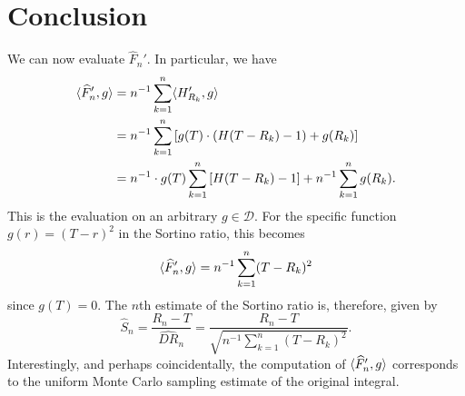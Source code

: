 \documentclass[12pt]{article}
\newcommand{\DD}{\mathcal{D}}
\newcommand{\inv}{{}^{-1}}
\renewcommand{\hat}{\widehat}
\DeclarePairedDelimiter{\ip}{\langle}{\rangle}
\begin{document}
\section{Conclusion}

We can now evaluate $\hat{F}_{n}'$. In particular, we have
\begin{align*}
  \ip{\hat{F}_n', g} &= n\inv \sum_{k=1}^{n} \ip{H_{R_k}', g} \\
  &= n\inv \sum_{k=1}^{n} \left[ 
    g(T) \cdot (H(T-R_k) - 1) + g(R_k)
  \right] \\
  &= n\inv \cdot g(T) \sum_{k=1}^{n} \left[ 
    H(T-R_k) - 1 
  \right] 
  + n\inv \sum_{k=1}^{n} g(R_k).
\end{align*}
This is the evaluation on an arbitrary $g \in \DD$. For the specific function
$g(r) = (T-r)^2$ in the Sortino ratio, this becomes
\begin{equation*}
  \ip{\hat{F}_n', g} = n\inv \sum_{k=1}^{n} (T-R_k)^2
\end{equation*}
since $g(T) = 0$.  The $n$th estimate of the Sortino ratio is, therefore, given
by
\begin{equation*}
  \widehat{S}_n = \frac{R_n - T}{\hat{\textit{DR}}_n} = 
  \frac{R_n - T}{\sqrt{n\inv \sum_{k=1}^{n} (T-R_k)^2}}.
\end{equation*}
Interestingly, and perhaps coincidentally, the computation of $\ip{\hat{F}_n',
g}$ corresponds to the uniform Monte Carlo sampling estimate of the original
integral.
\end{document}
